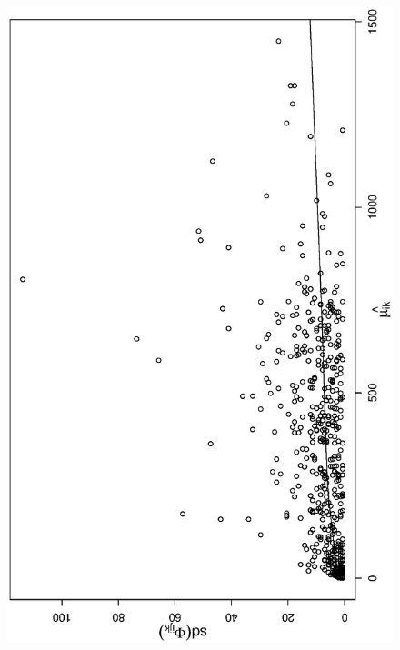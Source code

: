 \documentclass[11pt, fleqn]{article}
\begin{document}
\begin{figure}[t]
\begin{center}
\begin{minipage}{8cm}
\includegraphics[scale=0.3, angle=-90]{pic/hu_mean_sd_all.ps}
\end{minipage}
\hfill
\begin{minipage}{8cm}

\end{minipage}
\end{center}
\end{figure}
\end{document}
